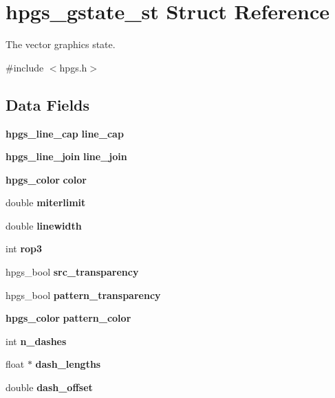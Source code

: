 \section{hpgs\_\-gstate\_\-st Struct Reference}
\label{structhpgs__gstate__st}


The vector graphics state.  




{\ttfamily \#include $<$hpgs.h$>$}

\subsection*{Data Fields}
\begin{DoxyCompactItemize}
\item 
{\bf hpgs\_\-line\_\-cap} {\bfseries line\_\-cap}\label{structhpgs__gstate__st_ae9b79ad6a33b766e514345b333bd6931}

\item 
{\bf hpgs\_\-line\_\-join} {\bfseries line\_\-join}\label{structhpgs__gstate__st_a03588e191e3505d53cc305519cf0e380}

\item 
{\bf hpgs\_\-color} {\bfseries color}\label{structhpgs__gstate__st_a132fefa979e11800b5d8eda532f14b9c}

\item 
double {\bfseries miterlimit}\label{structhpgs__gstate__st_a92bbd003e1738f6bada4871b9063966f}

\item 
double {\bfseries linewidth}\label{structhpgs__gstate__st_a6d1292cbae2afafb55c79dd1f3de79f4}

\item 
int {\bfseries rop3}\label{structhpgs__gstate__st_add8f9df29bc513931825fafb5d097143}

\item 
hpgs\_\-bool {\bfseries src\_\-transparency}\label{structhpgs__gstate__st_a9a1a4c49e9ce54f3123ce4d2eb5817af}

\item 
hpgs\_\-bool {\bfseries pattern\_\-transparency}\label{structhpgs__gstate__st_aacb6ea8542981623f3d2b93a008a3925}

\item 
{\bf hpgs\_\-color} {\bfseries pattern\_\-color}\label{structhpgs__gstate__st_a45bef16b715311be78d822764763ecb3}

\item 
int {\bfseries n\_\-dashes}\label{structhpgs__gstate__st_af651383ca35b41f0a37240753d728cd4}

\item 
float $\ast$ {\bfseries dash\_\-lengths}\label{structhpgs__gstate__st_aaa22013f077958d38b95145df9b17087}

\item 
double {\bfseries dash\_\-offset}\label{structhpgs__gstate__st_a46ca99dff28cd2de9836af61b3373a2f}

\end{DoxyCompactItemize}


